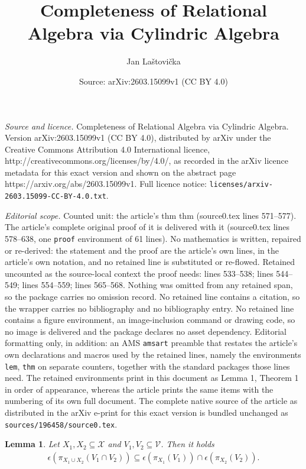 \documentclass[10pt,a4paper]{amsart}
\title{Completeness of Relational Algebra via Cylindric Algebra}
\author{Jan La\v{s}tovi\v{c}ka}
\date{Source: arXiv:2603.15099v1 (CC BY 4.0)}
\newtheorem{lem}{Lemma}
\def\V{\mathcal V}
\def\X{\mathcal X}
\begin{document}
\maketitle

\noindent\emph{Source and licence.} Completeness of Relational Algebra via Cylindric Algebra. Version arXiv:2603.15099v1 (CC BY 4.0), distributed by arXiv under the Creative Commons Attribution 4.0 International licence, http://creativecommons.org/licenses/by/4.0/, as recorded in the arXiv licence metadata for this exact version and shown on the abstract page https://arxiv.org/abs/2603.15099v1. Full licence notice: \texttt{licenses/arxiv-2603.15099-CC-BY-4.0.txt}.\par\smallskip

\noindent\textit{Editorial scope.} Counted unit: the article's thm thm (source0.tex lines 571--577). The article's complete original proof of it is delivered with it (source0.tex lines 578--638, one \texttt{proof} environment of 61 lines). No mathematics is written, repaired or re-derived: the statement and the proof are the article's own lines, in the article's own notation, and no retained line is substituted or re-flowed.  Retained uncounted as the source-local context the proof needs: lines 533--538; lines 544--549; lines 554--559; lines 565--568.  Nothing was omitted from any retained span, so the package carries no omission record.  No retained line contains a citation, so the wrapper carries no bibliography and no bibliography entry.  No retained line contains a figure environment, an image-inclusion command or drawing code, so no image is delivered and the package declares no asset dependency.  Editorial formatting only, in addition: an AMS \texttt{amsart} preamble that restates the article's own declarations and macros used by the retained lines, namely the environments \texttt{lem}, \texttt{thm} on separate counters, together with the standard packages those lines need.  The retained environments print in this document as Lemma 1, Theorem 1 in order of appearance, whereas the article prints the same items with the numbering of its own full document.  The complete native source of the article as distributed in the arXiv e-print for this exact version is bundled unchanged as \texttt{sources/196458/source0.tex}.
\begin{lem}\label{lem:cap_project}
Let $X_1,X_2\subseteq\X$ and $V_1,V_2\subseteq\V$. Then it holds
\begin{align*}
\epsilon(\pi_{X_1\cup X_2}(V_1\cap V_2))\subseteq\epsilon(\pi_{X_1}(V_1))\cap\epsilon(\pi_{X_2}(V_2)).
\end{align*}
\end{lem}
\end{document}
